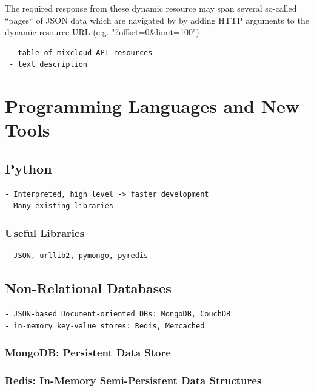 \documentclass[a4paper,12pt,twoside,notitlepage]{report}
\begin{document}
The required response from these dynamic resource may span several
so-called ``pages`` of JSON data which are navigated by by adding HTTP
arguments to the dynamic resource URL (e.g. "?offset=0\&limit=100")


\begin{verbatim}
 - table of mixcloud API resources
 - text description
\end{verbatim}



\section{Programming Languages and New Tools}

\subsection{Python}

\begin{verbatim}
- Interpreted, high level -> faster development
- Many existing libraries 
\end{verbatim}

\subsubsection{Useful Libraries}
\begin{verbatim}
- JSON, urllib2, pymongo, pyredis
\end{verbatim}


\subsection{Non-Relational Databases}

\begin{verbatim}
- JSON-based Document-oriented DBs: MongoDB, CouchDB
- in-memory key-value stores: Redis, Memcached
\end{verbatim}

\subsubsection{MongoDB: Persistent Data Store} 

\subsubsection{Redis: In-Memory Semi-Persistent Data Structures} 
\end{document}
